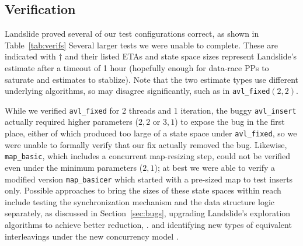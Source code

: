 \documentclass{article}
\begin{document}
\newpage
\subsection{Verification}

Landslide proved several of our test configurations correct, as shown in Table~\ref{tab:verifs}
Several larger tests we were unable to complete. %
These are indicated with $\dagger$ %
and their listed ETAs and state space sizes represent Landslide's estimate %
after a timeout of 1 hour
(hopefully enough for data-race PPs to saturate and estimates to stablize).
Note that the two estimate types use different underlying algorithms, so may disagree significantly,
such as in {\tt avl\_fixed}$(2,2)$.

While we verified {\tt avl\_fixed} for 2 threads and 1 iteration,
the buggy {\tt avl\_insert} actually required higher parameters ($2,2$ or $3,1$) to expose the bug in the first place,
either of which produced too large of a state space under {\tt avl\_fixed},
so we were unable to formally verify that our fix actually removed the bug.
Likewise, {\tt map\_basic}, which includes a concurrent map-resizing step,
could not be verified even under the minimum parameters ($2,1$);
at best we were able to verify a modified version {\tt map\_basicer}
which started with a pre-sized map to test inserts only.
Possible approaches to bring the sizes of these state spaces within reach
include testing the synchronization mechanism and the data structure logic separately, as discussed in Section~\ref{sec:bugs},
upgrading Landslide's exploration algorithms to achieve better reduction,
\cite{optimal-dpor,mcr}.
and identifying new types of equivalent interleavings under the new concurrency model \cite{thesprop}.
\end{document}
